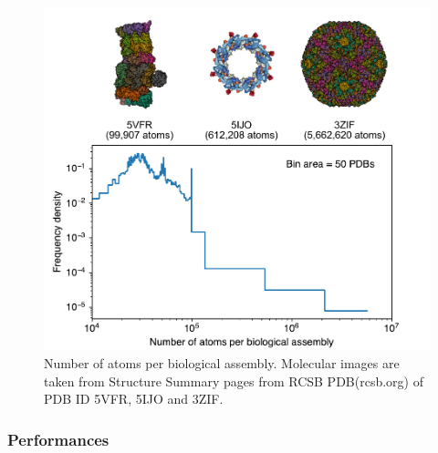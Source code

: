\begin{figure}
\includegraphics[width=1.0\textwidth,keepaspectratio]
{./figures/num_atom_per_bio_assem.pdf}

\caption{Number of atoms per biological assembly.  Molecular images are taken
from Structure Summary pages from RCSB PDB(rcsb.org) of PDB ID
5VFR\cite{zhuStructuralMechanismNucleotidedriven2018}, 5IJO\cite{kosinskiMolecularArchitectureInner2016} and
3ZIF\cite{chengCryoEMStructuresTwo2014}.}

\label{fig: num atom per bio assem}
\end{figure}


\subsubsection{Performances}

